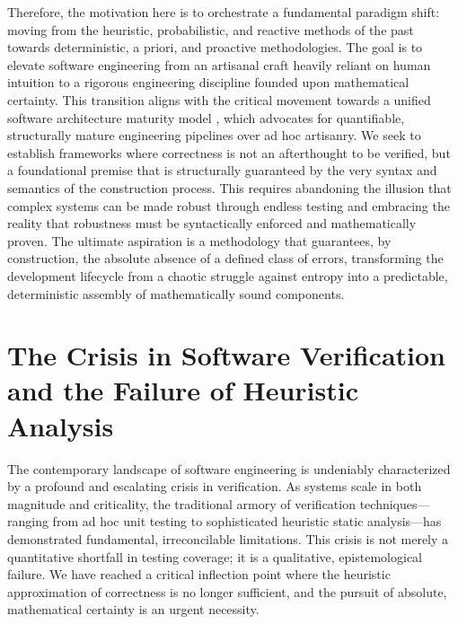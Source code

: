 Therefore, the motivation here is to orchestrate a fundamental paradigm shift: moving from the heuristic, probabilistic, and reactive methods of the past towards deterministic, a priori, and proactive methodologies. The goal is to elevate software engineering from an artisanal craft heavily reliant on human intuition to a rigorous engineering discipline founded upon mathematical certainty. This transition aligns with the critical movement towards a unified software architecture maturity model \cite{ref_TowardsaSoftwar6}, which advocates for quantifiable, structurally mature engineering pipelines over ad hoc artisanry. We seek to establish frameworks where correctness is not an afterthought to be verified, but a foundational premise that is structurally guaranteed by the very syntax and semantics of the construction process. This requires abandoning the illusion that complex systems can be made robust through endless testing and embracing the reality that robustness must be syntactically enforced and mathematically proven. The ultimate aspiration is a methodology that guarantees, by construction, the absolute absence of a defined class of errors, transforming the development lifecycle from a chaotic struggle against entropy into a predictable, deterministic assembly of mathematically sound components.

\section{The Crisis in Software Verification and the Failure of Heuristic Analysis}
\label{sec:intro_crisis}

The contemporary landscape of software engineering is undeniably characterized by a profound and escalating crisis in verification. As systems scale in both magnitude and criticality, the traditional armory of verification techniques—ranging from ad hoc unit testing to sophisticated heuristic static analysis—has demonstrated fundamental, irreconcilable limitations. This crisis is not merely a quantitative shortfall in testing coverage; it is a qualitative, epistemological failure. We have reached a critical inflection point where the heuristic approximation of correctness is no longer sufficient, and the pursuit of absolute, mathematical certainty is an urgent necessity.

